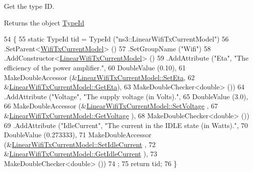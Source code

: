 Get the type ID. 

\begin{DoxyReturn}{Returns}
the object \hyperlink{classns3_1_1TypeId}{Type\+Id} 
\end{DoxyReturn}

\begin{DoxyCode}
54 \{
55   \textcolor{keyword}{static} TypeId tid = TypeId (\textcolor{stringliteral}{"ns3::LinearWifiTxCurrentModel"})
56     .SetParent<\hyperlink{classns3_1_1WifiTxCurrentModel_a28f4130afdaa514c8010b8f17d0c53de}{WifiTxCurrentModel}> ()
57     .SetGroupName (\textcolor{stringliteral}{"Wifi"})
58     .AddConstructor<\hyperlink{classns3_1_1LinearWifiTxCurrentModel_a17ea1b5907a8d6cdfd07997487cd9893}{LinearWifiTxCurrentModel}> ()
59     .AddAttribute (\textcolor{stringliteral}{"Eta"}, \textcolor{stringliteral}{"The efficiency of the power amplifier."},
60                    DoubleValue (0.10),
61                    MakeDoubleAccessor (&\hyperlink{classns3_1_1LinearWifiTxCurrentModel_a6b5834040f52b26470904a5d0ad1f11d}{LinearWifiTxCurrentModel::SetEta},
62                                        &\hyperlink{classns3_1_1LinearWifiTxCurrentModel_a5cc5bbbe7161bba9a13f1ee5a3e249bc}{LinearWifiTxCurrentModel::GetEta}),
63                    MakeDoubleChecker<double> ())
64     .AddAttribute (\textcolor{stringliteral}{"Voltage"}, \textcolor{stringliteral}{"The supply voltage (in Volts)."},
65                    DoubleValue (3.0),
66                    MakeDoubleAccessor (&\hyperlink{classns3_1_1LinearWifiTxCurrentModel_a329854d859903929d47933920df8b1a0}{LinearWifiTxCurrentModel::SetVoltage}
      ,
67                                        &\hyperlink{classns3_1_1LinearWifiTxCurrentModel_a2f197328c785ab3e7c915f6388ad8933}{LinearWifiTxCurrentModel::GetVoltage}
      ),
68                    MakeDoubleChecker<double> ())
69     .AddAttribute (\textcolor{stringliteral}{"IdleCurrent"}, \textcolor{stringliteral}{"The current in the IDLE state (in Watts)."},
70                    DoubleValue (0.273333),
71                    MakeDoubleAccessor (&\hyperlink{classns3_1_1LinearWifiTxCurrentModel_ada72e108df30ab42cde59ed5aeb87846}{LinearWifiTxCurrentModel::SetIdleCurrent}
      ,
72                                        &\hyperlink{classns3_1_1LinearWifiTxCurrentModel_a604f7ed3cd2adc7134d7f6a42591819c}{LinearWifiTxCurrentModel::GetIdleCurrent}
      ),
73                    MakeDoubleChecker<double> ())
74   ;
75   \textcolor{keywordflow}{return} tid;
76 \}
\end{DoxyCode}


